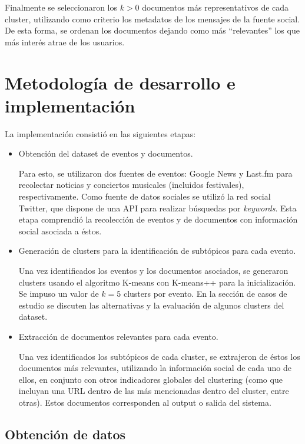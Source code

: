 \documentclass[upright, contnum]{umemoria}
\begin{document}
   Finalmente se seleccionaron los $k>0$ documentos más representativos de
   cada cluster, utilizando como criterio los metadatos de los
   mensajes de la fuente social. De esta forma, se ordenan los
   documentos dejando como más ``relevantes'' los que más interés atrae
   de los usuarios.

\section{Metodología de desarrollo e implementación}
\label{sec-4.2}

\label{impl}

   La implementación consistió en las siguientes etapas:

\begin{itemize}
\item Obtención del dataset de eventos y documentos.

     Para esto, se utilizaron dos fuentes de eventos: Google News y
     Last.fm para recolectar noticias y conciertos musicales
     (incluidos festivales), respectivamente. Como fuente de datos
     sociales se utilizó la red social Twitter, que dispone de una API
     para realizar búsquedas por \emph{keywords}. Esta etapa comprendió
     la recolección de eventos y de documentos con información social
     asociada a éstos.
\item Generación de clusters para la identificación de subtópicos para
     cada evento.

     Una vez identificados los eventos y los documentos asociados, se
     generaron clusters usando el algoritmo K-means con K-means++ para
     la inicialización. Se impuso un valor de $k=5$ clusters por
     evento. En la sección de casos de estudio se discuten las
     alternativas y la evaluación de algunos clusters del dataset.
\item Extracción de documentos relevantes para cada evento.

     Una vez identificados los subtópicos de cada cluster, se
     extrajeron de éstos los documentos más relevantes, utilizando la
     información social de cada uno de ellos, en conjunto con otros
     indicadores globales del clustering (como que incluyan una URL
     dentro de las más mencionadas dentro del cluster, entre
     otras). Estos documentos corresponden al output o salida del
     sistema.
\end{itemize}
\subsection{Obtención de datos}
\label{sec-4.2.1}
\end{document}
